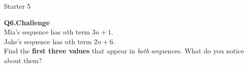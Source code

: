 \documentclass{beamer}
\newcommand{\ashow}[1]{\uncover<2->{\textcolor{red}{\small #1}}}
\begin{document}
\begin{frame}[shrink=5]{Starter 5}
\begin{minipage}[t]{0.48\textwidth}
    \vspace{0.45cm}

        \small\textbf{Q6.\;Challenge}\\
    \footnotesize
    Mia's sequence has $n$th term $3n+1$.\\
    Jake's sequence has $n$th term $2n+6$.\\
    Find the \textbf{first three values} that appear
    in \emph{both} sequences.
    What do you notice about them?\\[0.2em]
    \ashow{Shared values:\;$10,\;16,\;22,\;\ldots$
           \;(they increase by 6 each time).}
    
  \end{minipage}

\end{frame}
\end{document}
